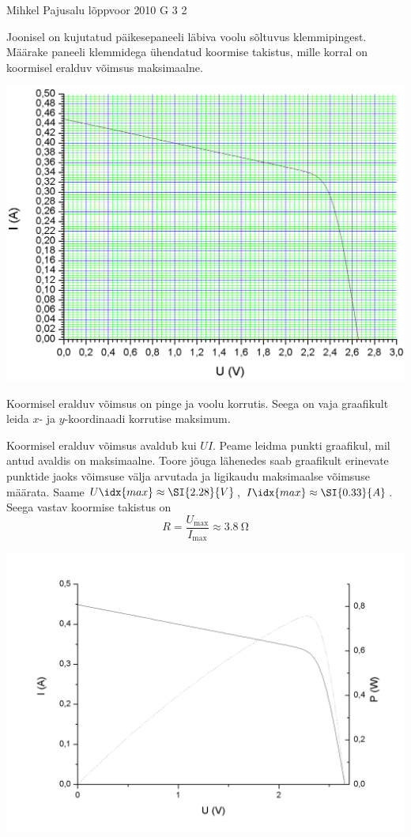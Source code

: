 {Mihkel Pajusalu} %
{lõppvoor} %
{2010} %
{G 3} %
{2} %
{
\ifStatement
Joonisel on kujutatud päikesepaneeli läbiva voolu sõltuvus klemmipingest.
Määrake paneeli klemmidega ühendatud koormise takistus, mille korral on koormisel eralduv
võimsus maksimaalne.

\begin{center}
	\includegraphics[width=0.9\linewidth]{2010-v3g-03-paneel_yl.png}
\end{center}
\fi


\ifHint
Koormisel eralduv võimsus on pinge ja voolu korrutis. Seega on vaja graafikult leida $x$- ja $y$-koordinaadi korrutise maksimum.
\fi


\ifSolution
Koormisel eralduv võimsus avaldub kui $UI$. Peame leidma punkti graafikul, mil antud avaldis on maksimaalne. Toore jõuga lähenedes saab graafikult erinevate punktide jaoks võimsuse välja arvutada ja ligikaudu maksimaalse võimsuse määrata. Saame $U\idx{max} \approx \SI{2.28}{V}$, $I\idx{max}\approx \SI{0.33}{A}$. Seega vastav koormise takistus on
\[
R = \frac{U_\mathrm{max}}{I_\mathrm{max}} \approx \SI{3.8}{\ohm}
\]


\begin{center}
	\vspace{-0.1cm}
	\includegraphics[width=0.8\linewidth]{2010-v3g-03-paneel_lah.png}
\end{center}

}
